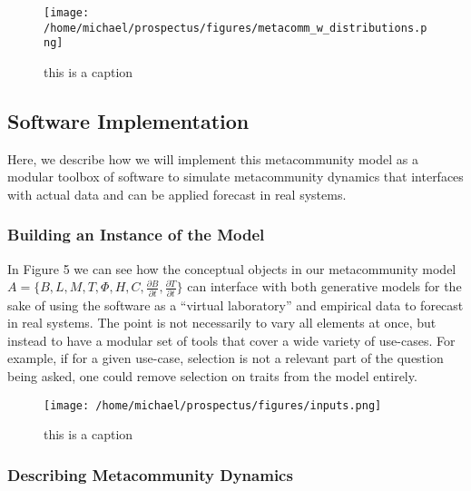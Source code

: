 \documentclass[]{article}
\begin{document}
\begin{figure}[H]
\centering
\texttt{[image: /home/michael/prospectus/figures/metacomm\_w\_distributions.png]}
\caption{this is a caption}
\end{figure}

\hypertarget{software-implementation}{%
\subsection{Software Implementation}\label{software-implementation}}

Here, we describe how we will implement this metacommunity model as a
modular toolbox of software to simulate metacommunity dynamics that
interfaces with actual data and can be applied forecast in real systems.

\hypertarget{interfacing-with-generative-models-and-data}{%
\subsubsection{Building an Instance of the Model}
\label{interfacing-with-generative-models-and-data}}
In Figure 5 we can see how the conceptual objects in our metacommunity
model
\(A = \{B, L, M, T, \Phi, H, C, \frac{\partial B}{\partial t}, \frac{\partial T}{\partial t} \}\)
can interface with both generative models for the sake of using the
software as a ``virtual laboratory'' \citep{volker_grimm} and
empirical data to forecast in real systems. The point is not necessarily
to vary all elements at once, but instead to have a modular set of tools
that cover a wide variety of use-cases. For example, if for a given use-case, selection is not a relevant part of the question being asked, one could remove selection on traits from the model entirely.

\begin{figure}[H]
\centering
\texttt{[image: /home/michael/prospectus/figures/inputs.png]}
\caption{this is a caption}
\end{figure}



\hypertarget{finding-the-pseudoequilibria-of-our-metacommunity-model}{%
\subsubsection{Describing Metacommunity Dynamics}
\label{finding-the-pseudoequilibria-of-our-metacommunity-model}}
\end{document}
